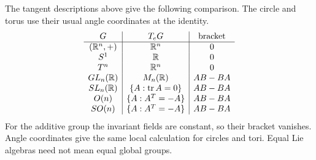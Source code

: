 \begin{remark}
The tangent descriptions above give the following comparison. The circle
and torus use their usual angle coordinates at the identity.
\[
\begin{array}{c|c|c}
G&T_eG&\text{bracket}\\\hline
(\mathbb{R}^n,+)&\mathbb{R}^n&0\\
S^1&\mathbb{R}&0\\
T^n&\mathbb{R}^n&0\\
GL_n(\mathbb{R})&M_n(\mathbb{R})&AB-BA\\
SL_n(\mathbb{R})&\{A:\operatorname{tr}A=0\}&AB-BA\\
O(n)&\{A:A^T=-A\}&AB-BA\\
SO(n)&\{A:A^T=-A\}&AB-BA
\end{array}
\]
For the additive group the invariant fields are constant, so their bracket
vanishes. Angle coordinates give the same local calculation for circles
and tori. Equal Lie algebras need not mean equal global groups.
\end{remark}


